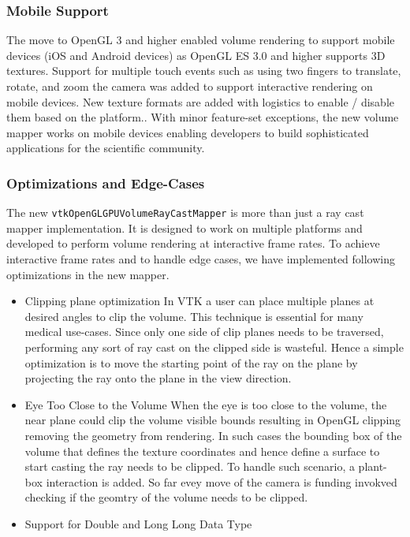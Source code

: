 \subsubsection{Mobile Support}
The move to OpenGL 3 and higher enabled volume rendering to support mobile devices (iOS and Android devices) as OpenGL ES 3.0 and higher supports 3D textures. Support for multiple touch events such as using two fingers to translate, rotate, and zoom the camera was added to support interactive rendering on mobile devices. New texture formats are added with logistics to enable / disable them based on the platform.. With minor feature-set exceptions, the new volume mapper works on mobile devices enabling developers to build sophisticated applications for the scientific community.

\subsubsection{Optimizations and Edge-Cases}
The new \texttt{vtkOpenGLGPUVolumeRayCastMapper} is more than just a ray cast mapper implementation. It is designed to work on multiple platforms and developed to perform volume rendering at interactive frame rates. To achieve interactive frame rates and to handle edge cases, we have implemented following optimizations in the new mapper. 

\begin{itemize}
\item Clipping plane optimization 
In VTK a user can place multiple planes at desired angles to clip the volume. This technique is essential for many medical use-cases. Since only one side of clip planes needs to be traversed, performing any sort of ray cast on the clipped side is wasteful. Hence a simple optimization is to move the starting point of the ray on the plane by projecting the ray onto the plane in the view direction. 

\item Eye Too Close to the Volume
When the eye is too close to the volume, the near plane could clip the volume visible bounds resulting in OpenGL clipping removing the geometry from rendering. In such cases the bounding box of the volume that defines the texture coordinates and hence define a surface to start casting the ray needs to be clipped. To handle such scenario, a plant-box interaction is added. So far evey move of the camera is funding invokved checking if the geomtry of the volume needs to be clipped.

\item Support for Double and Long Long Data Type


\end{itemize}